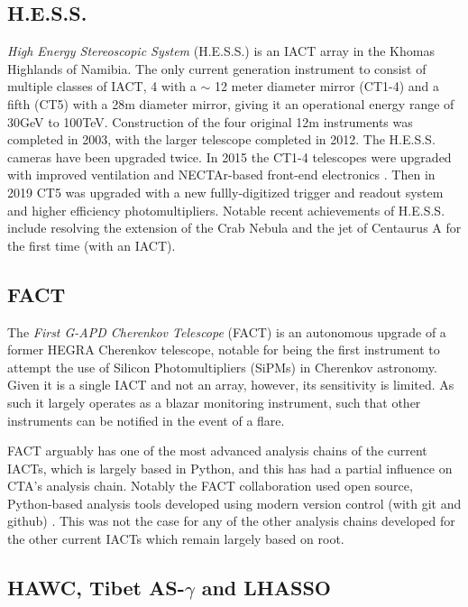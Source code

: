 \subsection{H.E.S.S.}
\textit{High Energy Stereoscopic System} (H.E.S.S.) is an IACT array in the Khomas Highlands of Namibia. The only current generation instrument to consist of multiple classes of IACT, 4 with a $\sim$ 12 meter diameter mirror (CT1-4) and a fifth (CT5) with a 28m diameter mirror, giving it an operational energy range of 30GeV to 100TeV. Construction of the four original 12m instruments was completed in 2003, with the larger telescope completed in 2012. The H.E.S.S. cameras have been upgraded twice. In 2015 the CT1-4 telescopes were upgraded with improved ventilation and NECTAr-based front-end electronics \cite{hess1u}. Then in 2019 CT5 was upgraded with a new fullly-digitized trigger and readout system and higher efficiency photomultipliers. Notable recent achievements of H.E.S.S. include resolving the extension of the Crab Nebula \cite{crabextension} and the jet of Centaurus A \cite{cena} for the first time (with an IACT).

\subsection{FACT}
The \textit{First G-APD Cherenkov Telescope} (FACT) is an autonomous upgrade of a former HEGRA Cherenkov telescope, notable for being the first instrument to attempt the use of Silicon Photomultipliers (SiPMs) in Cherenkov astronomy. Given it is a single IACT and not an array, however, its sensitivity is limited. As such it largely operates as a blazar monitoring instrument, such that other instruments can be notified in the event of a flare. 

FACT arguably has one of the most advanced analysis chains of the current IACTs, which is largely based in Python, and this has had a partial influence on CTA's analysis chain. Notably the FACT collaboration used open source, Python-based analysis tools developed using modern version control (with git and github) \cite{factspec}. This was not the case for any of the other analysis chains developed for the other current IACTs which remain largely based on root.

\subsection{HAWC, Tibet AS-\ensuremath{\gamma} and LHASSO}

